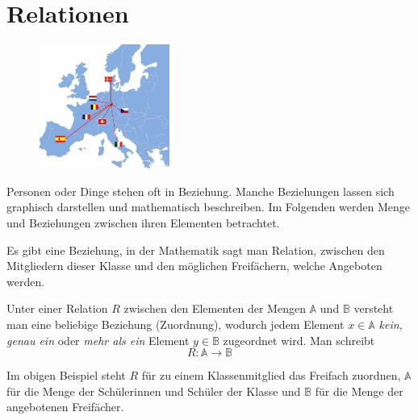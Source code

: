 \documentclass[%
11pt,%
twoside,%
titlepage,%
german,%
headsepline%
]{scrartcl}
\newcommand{\definition}[1]{\colorbox{emerald}{#1}}
\begin{document}
\cleardoublepage

\appendix

\clearpage

\section{Relationen}
\begin{figure}
  \begin{center}
    \includegraphics[width=0.382\textwidth]{pictures/relationen}
  \end{center}
\end{figure}
Personen oder Dinge stehen oft in Beziehung. Manche Beziehungen lassen sich graphisch darstellen und mathematisch beschreiben. Im Folgenden werden Menge und Beziehungen zwischen ihren Elementen betrachtet.
\begin{bsp}
Es gibt eine Beziehung, in der Mathematik sagt man \definition{Relation}, zwischen den Mitgliedern dieser Klasse und den m\"oglichen Freif\"achern, welche Angeboten werden.
\end{bsp}
\begin{bem}
Unter einer Relation $R$ zwischen den Elementen der Mengen $\mathbb{A}$ und $\mathbb{B}$ versteht man eine beliebige Beziehung (Zuordnung), wodurch jedem Element $x\in\mathbb{A}$ \emph{kein, genau ein} oder \emph{mehr als ein} Element $y\in\mathbb{B}$ zugeordnet wird. Man schreibt
$$R:\mathbb{A}\longrightarrow\mathbb{B}$$
\end{bem}
\begin{bsp}
Im obigen Beispiel steht $R$ f\"ur \glqq zu einem Klassenmitglied das Freifach zuordnen\grqq, $\mathbb{A}$ f\"ur die Menge der Sch\"ulerinnen und Sch\"uler der Klasse und $\mathbb{B}$ f\"ur die Menge der angebotenen Freif\"acher.
\end{bsp}
\end{document}
